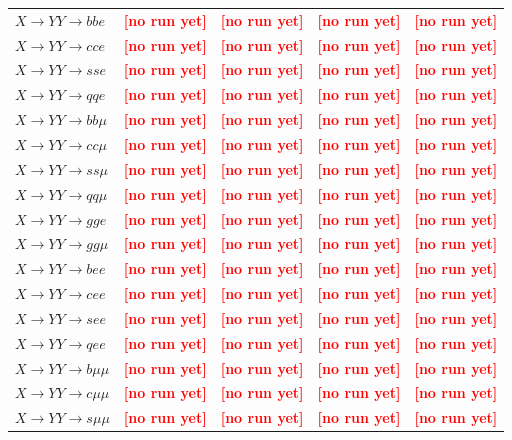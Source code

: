\documentclass[12pt]{article}   %
\newcommand{\pending}[1]{\textcolor{red}{\textbf{[#1]}}}
\begin{document}
\begin{landscape}
{\begin{longtable}{@{\extracolsep{\fill}}lcccc@{}}
\midrule
$X\to YY\to bbe$ & \pending{no run yet} & \pending{no run yet} & \pending{no run yet} & \pending{no run yet} \\
$X\to YY\to cce$ & \pending{no run yet} & \pending{no run yet} & \pending{no run yet} & \pending{no run yet} \\
$X\to YY\to sse$ & \pending{no run yet} & \pending{no run yet} & \pending{no run yet} & \pending{no run yet} \\
$X\to YY\to qqe$ & \pending{no run yet} & \pending{no run yet} & \pending{no run yet} & \pending{no run yet} \\
$X\to YY\to bb\mu$ & \pending{no run yet} & \pending{no run yet} & \pending{no run yet} & \pending{no run yet} \\
$X\to YY\to cc\mu$ & \pending{no run yet} & \pending{no run yet} & \pending{no run yet} & \pending{no run yet} \\
$X\to YY\to ss\mu$ & \pending{no run yet} & \pending{no run yet} & \pending{no run yet} & \pending{no run yet} \\
$X\to YY\to qq\mu$ & \pending{no run yet} & \pending{no run yet} & \pending{no run yet} & \pending{no run yet} \\
$X\to YY\to gge$ & \pending{no run yet} & \pending{no run yet} & \pending{no run yet} & \pending{no run yet} \\
$X\to YY\to gg\mu$ & \pending{no run yet} & \pending{no run yet} & \pending{no run yet} & \pending{no run yet} \\
\midrule
$X\to YY\to bee$ & \pending{no run yet} & \pending{no run yet} & \pending{no run yet} & \pending{no run yet} \\
$X\to YY\to cee$ & \pending{no run yet} & \pending{no run yet} & \pending{no run yet} & \pending{no run yet} \\
$X\to YY\to see$ & \pending{no run yet} & \pending{no run yet} & \pending{no run yet} & \pending{no run yet} \\
$X\to YY\to qee$ & \pending{no run yet} & \pending{no run yet} & \pending{no run yet} & \pending{no run yet} \\
$X\to YY\to b\mu\mu$ & \pending{no run yet} & \pending{no run yet} & \pending{no run yet} & \pending{no run yet} \\
$X\to YY\to c\mu\mu$ & \pending{no run yet} & \pending{no run yet} & \pending{no run yet} & \pending{no run yet} \\
$X\to YY\to s\mu\mu$ & \pending{no run yet} & \pending{no run yet} & \pending{no run yet} & \pending{no run yet} \\

\end{longtable}}
\end{landscape}
\end{document}
